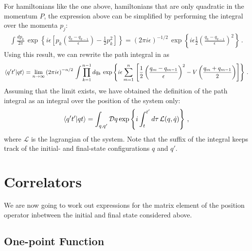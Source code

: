 For hamiltonians like the one above, \ie hamiltonians that are only
quadratic in the momentum $\hat{P}$, the expression above can be
simplified by performing the integral over the momenta $p_j$:
\begin{align}
  \int \frac{dp_k}{2\pi}\, \exp\left\{
  i\epsilon\left[
  p_k \left(\frac{q_k-q_{k-1}}{\epsilon}\right) - \frac12 p_k^2
  \right]
  \right\} = \left(2\pi i \epsilon\right)^{-1/2}\,
  \exp\left\{i\epsilon
  \frac12\left(\frac{q_k-q_{k-1}}{\epsilon}\right)^2\right\}\, .
\end{align}
Using this result, we can rewrite the path integral in
 as
\begin{align}
  \label{eq:PathIntDefOne}
  \langle q't' | qt \rangle = \lim_{n\to\infty}
  \left(2\pi i \epsilon\right)^{-n/2}\,
  \int \prod_{k=1}^{n-1}dq_k\, 
  \exp \left\{
  i \epsilon \sum_{m=1}^{n}
  \, \left[
  \frac12 \left(\frac{q_m-q_{m-1}}{\epsilon}\right)^2
  -V\left(\frac{q_m+q_{m-1}}{2}\right)
  \right]
  \right\}\, .
\end{align}
Assuming that the limit exists, we have obtained the definition of the
path integral as an integral over the position of the system only: 
\begin{align}
  \label{eq:PathIntDef}
  \langle q't' | qt \rangle = 
  \int_{q,q'} \mathcal{D}q \exp \left\{
  i \int_t^{t'} d\tau\,  \mathcal{L}(q,\dot{q})
  \right\}\, ,
\end{align}
where $\mathcal{L}$ is the lagrangian of the system. Note that the
suffix of the integral keeps track of the initial- and final-state
configurations $q$ and $q'$. 

\section{Correlators}
\label{sec:correlators}

We are now going to work out expressions for the matrix element of the
position operator inbetween the initial and final state considered
above. 

\subsection{One-point Function}
\label{sec:one-point-function}

